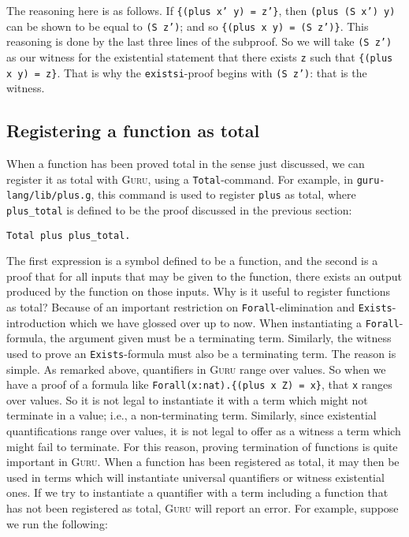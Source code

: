 \documentclass{book}[12pt]
\newcommand{\guru}[0]{\textsc{Guru}\xspace}
\begin{document}
\noindent The reasoning here is as follows.  If \texttt{\{(plus x' y)
= z'\}}, then \texttt{(plus (S x') y)} can be shown to be equal to
\texttt{(S z')}; and so \texttt{\{(plus x y) = (S z')\}}.  This
reasoning is done by the last three lines of the subproof.  So we will
take \texttt{(S z')} as our witness for the existential statement that
there exists \texttt{z} such that \texttt{\{(plus x y) = z\}}.  That is
why the \texttt{existsi}-proof begins with \texttt{(S z')}: that is
the witness.

\subsection{Registering a function as total}
\label{ch5:regtotal}

When a function has been proved total in the sense just discussed, we
can register it as total with \guru, using a \texttt{Total}-command.
For example, in \texttt{guru-lang/lib/plus.g}, this command is used
to register \texttt{plus} as total, where \texttt{plus\_total} is
defined to be the proof discussed in the previous section:

\begin{verbatim}
Total plus plus_total.
\end{verbatim}

\noindent The first expression is a symbol defined to be a function,
and the second is a proof that for all inputs that may be given to the
function, there exists an output produced by the function on those
inputs.  Why is it useful to register functions as total?  Because of
an important restriction on \texttt{Forall}-elimination and
\texttt{Exists}-introduction which we have glossed over up to now.
When instantiating a \texttt{Forall}-formula, the argument given must
be a terminating term.  Similarly, the witness used to prove an
\texttt{Exists}-formula must also be a terminating term.  The reason
is simple.  As remarked above, quantifiers in \guru range over values.
So when we have a proof of a formula like
\texttt{Forall(x:nat).\{(plus x Z) = x\}}, that \texttt{x} ranges over
values.  So it is not legal to instantiate it with a term which might
not terminate in a value; i.e., a non-terminating term.  Similarly,
since existential quantifications range over values, it is not legal
to offer as a witness a term which might fail to terminate.  For this
reason, proving termination of functions is quite important in \guru.
When a function has been registered as total, it may then be used in
terms which will instantiate universal quantifiers or witness
existential ones.  If we try to instantiate a quantifier with a term
including a function that has not been registered as total, \guru will 
report an error.  For example, suppose we run the following:
\end{document}
